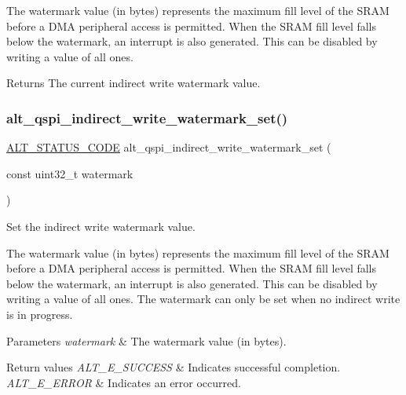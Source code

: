 The watermark value (in bytes) represents the maximum fill level of the S\+R\+AM before a D\+MA peripheral access is permitted. When the S\+R\+AM fill level falls below the watermark, an interrupt is also generated. This can be disabled by writing a value of all ones.

\begin{DoxyReturn}{Returns}
The current indirect write watermark value. 
\end{DoxyReturn}
\mbox{\label{group__ALT__QSPI__INDAC_ga073b6e8986e869fbde56e74e699feed1}} 
\subsubsection{\texorpdfstring{alt\_qspi\_indirect\_write\_watermark\_set()}{alt\_qspi\_indirect\_write\_watermark\_set()}}
{\footnotesize\ttfamily \mbox{\hyperlink{hwlib_8h_abdb0d369f069723ca55d6c94bcaaaa12}{A\+L\+T\+\_\+\+S\+T\+A\+T\+U\+S\+\_\+\+C\+O\+DE}} alt\+\_\+qspi\+\_\+indirect\+\_\+write\+\_\+watermark\+\_\+set (\begin{DoxyParamCaption}\item[{const uint32\+\_\+t}]{watermark }\end{DoxyParamCaption})}

Set the indirect write watermark value.

The watermark value (in bytes) represents the maximum fill level of the S\+R\+AM before a D\+MA peripheral access is permitted. When the S\+R\+AM fill level falls below the watermark, an interrupt is also generated. This can be disabled by writing a value of all ones. The watermark can only be set when no indirect write is in progress.


\begin{DoxyParams}{Parameters}
{\em watermark} & The watermark value (in bytes).\\
\hline
\end{DoxyParams}

\begin{DoxyRetVals}{Return values}
{\em A\+L\+T\+\_\+\+E\+\_\+\+S\+U\+C\+C\+E\+SS} & Indicates successful completion. \\
\hline
{\em A\+L\+T\+\_\+\+E\+\_\+\+E\+R\+R\+OR} & Indicates an error occurred. \\
\hline
\end{DoxyRetVals}
